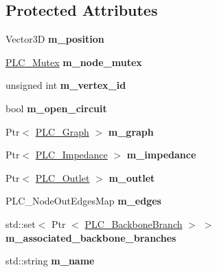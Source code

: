 \subsection*{\-Protected \-Attributes}
\begin{DoxyCompactItemize}
\item 
\hypertarget{classns3_1_1PLC__Node_a0cd50efe49ce06272051907a28c8b3aa}{\-Vector3\-D {\bfseries m\-\_\-position}}\label{classns3_1_1PLC__Node_a0cd50efe49ce06272051907a28c8b3aa}

\item 
\hypertarget{classns3_1_1PLC__Node_a620af6446076b03d0f010cc317027973}{\hyperlink{structns3_1_1PLC__Mutex}{\-P\-L\-C\-\_\-\-Mutex} {\bfseries m\-\_\-node\-\_\-mutex}}\label{classns3_1_1PLC__Node_a620af6446076b03d0f010cc317027973}

\item 
\hypertarget{classns3_1_1PLC__Node_a757708a106bfca54bf0135460ad1310c}{unsigned int {\bfseries m\-\_\-vertex\-\_\-id}}\label{classns3_1_1PLC__Node_a757708a106bfca54bf0135460ad1310c}

\item 
\hypertarget{classns3_1_1PLC__Node_a341489f0e9b80216fd7ac87fce77d88b}{bool {\bfseries m\-\_\-open\-\_\-circuit}}\label{classns3_1_1PLC__Node_a341489f0e9b80216fd7ac87fce77d88b}

\item 
\hypertarget{classns3_1_1PLC__Node_a9ec77cbb4e809ce63da6089288dde5b7}{\-Ptr$<$ \hyperlink{classns3_1_1PLC__Graph}{\-P\-L\-C\-\_\-\-Graph} $>$ {\bfseries m\-\_\-graph}}\label{classns3_1_1PLC__Node_a9ec77cbb4e809ce63da6089288dde5b7}

\item 
\hypertarget{classns3_1_1PLC__Node_aefbfc6758432979e81158f25b6b17aba}{\-Ptr$<$ \hyperlink{classns3_1_1PLC__ValueBase}{\-P\-L\-C\-\_\-\-Impedance} $>$ {\bfseries m\-\_\-impedance}}\label{classns3_1_1PLC__Node_aefbfc6758432979e81158f25b6b17aba}

\item 
\hypertarget{classns3_1_1PLC__Node_ae99868305e8498c70f01801d3ce21798}{\-Ptr$<$ \hyperlink{classns3_1_1PLC__Outlet}{\-P\-L\-C\-\_\-\-Outlet} $>$ {\bfseries m\-\_\-outlet}}\label{classns3_1_1PLC__Node_ae99868305e8498c70f01801d3ce21798}

\item 
\hypertarget{classns3_1_1PLC__Node_a026d4b0049bf2e529482a7aacf4ad5a7}{\-P\-L\-C\-\_\-\-Node\-Out\-Edges\-Map {\bfseries m\-\_\-edges}}\label{classns3_1_1PLC__Node_a026d4b0049bf2e529482a7aacf4ad5a7}

\item 
\hypertarget{classns3_1_1PLC__Node_a06802f7db36ff8fb9d72cc8257944f91}{std\-::set$<$ \-Ptr\*
$<$ \hyperlink{classns3_1_1PLC__BackboneBranch}{\-P\-L\-C\-\_\-\-Backbone\-Branch} $>$ $>$ {\bfseries m\-\_\-associated\-\_\-backbone\-\_\-branches}}\label{classns3_1_1PLC__Node_a06802f7db36ff8fb9d72cc8257944f91}

\item 
\hypertarget{classns3_1_1PLC__Node_ab2c054db2d9ee98a4d99010a5575337b}{std\-::string {\bfseries m\-\_\-name}}\label{classns3_1_1PLC__Node_ab2c054db2d9ee98a4d99010a5575337b}

\end{DoxyCompactItemize}
